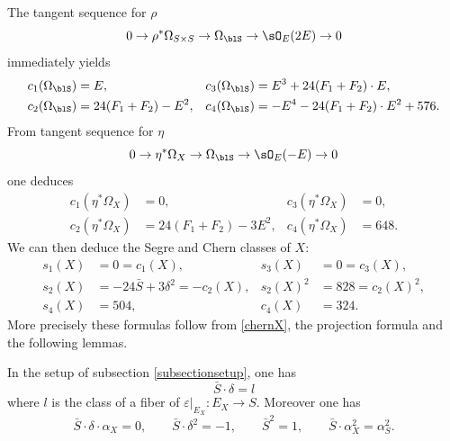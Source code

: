 The tangent sequence for $\rho$
\[
0 \to \rho^* \Omega_{S \times S} \to \Omega_{\blS} \to \sO_E(2E) \to 0
\]
immediately yields
\begin{equation} \label{chernblowup}
\begin{aligned}
c_1(\Omega_{\blS}) &= E, &
c_3(\Omega_{\blS}) &= E^3+ 24 (F_1+F_2) \cdot E,
\\
c_2(\Omega_{\blS}) &= 24 (F_1+F_2) - E^2, &
c_4(\Omega_{\blS}) &= - E^4 - 24 (F_1+F_2) \cdot E^2 + 576.
\end{aligned}
\end{equation}
From tangent sequence for $\eta$
\[
0 \to \eta^* \Omega_X \to \Omega_{\blS} \to \sO_E(-E) \to 0
\]
one deduces
\begin{equation} \label{chernX}
\begin{aligned}
c_1(\eta^* \Omega_X) &= 0, &
c_3(\eta^* \Omega_X) &= 0,
\\
c_2(\eta^* \Omega_X) &= 24 (F_1+F_2) - 3 E^2, &
c_4(\eta^* \Omega_X) &= 648.
\end{aligned}
\end{equation}
We can then deduce the Segre and Chern classes of $X$:
\begin{equation} \label{segreX}
\begin{aligned}
s_1(X) &= 0 = c_1(X),
&
s_3(X)&=0 = c_3(X),
\\
s_2(X) &= -24 \bar S + 3 \delta^2 = -c_2(X),
&
s_2(X)^2&=828=c_2(X)^2,
\\
s_4(X) &= 504,
&
c_4(X) &= 324.
\end{aligned}
\end{equation}
More precisely these formulas follow from \eqref{chernX}, the projection formula and the following lemmas.

\begin{lemma} \label{intersectionsS}
In the setup of subsection \ref{subsectionsetup}, one has
\[
\bar S \cdot \delta = l
\]
where $l$ is the class of a fiber of $\varepsilon|_{E_X}: E_X \to S$. Moreover one has
\[
\bar S \cdot \delta \cdot \alpha_X = 0, \qquad \bar S \cdot \delta^2=-1, \qquad \bar S^2 = 1, \qquad \bar S \cdot \alpha_X^2=\alpha_S^2.
\]
\end{lemma}

